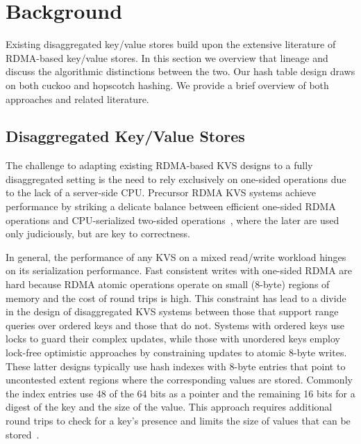 
\section{Background}
\label{sec:background}

Existing disaggregated key/value stores build upon the extensive literature of
RDMA-based key/value stores. In this section we overview that lineage and discuss the algorithmic
distinctions between the two. Our hash table design draws on both cuckoo and hopscotch hashing. We
provide a brief overview of both approaches and related literature.



\subsection{Disaggregated Key/Value Stores}

The challenge to adapting existing RDMA-based KVS designs to a fully
disaggregated setting is the need to rely exclusively on one-sided
operations due to the lack of a server-side CPU.  Precursor RDMA KVS
systems achieve performance by striking a delicate balance between
efficient one-sided RDMA operations and CPU-serialized two-sided
operations~\cite{farm,herd,pilaf,cell,storm}, where the later are used
only judiciously, but are key to correctness.

In general, the performance of any KVS on a mixed read/write workload
hinges on its serialization performance.  Fast consistent writes with
one-sided RDMA are hard because RDMA atomic operations operate on
small (8-byte) regions of memory and the cost of round trips is
high. This constraint has lead to a divide in the design of
disaggregated KVS systems between those that support range queries over
ordered keys and those that do not. Systems with ordered keys use
locks to guard their complex updates, while those
with unordered keys employ lock-free optimistic approaches by
constraining updates to atomic 8-byte writes. These latter designs
typically use hash indexes with 8-byte entries that point to
uncontested extent regions where the corresponding values are stored.
Commonly the index entries use 48 of the 64 bits as a pointer and the
remaining 16 bits for a digest of the key and the size of the value.
This approach requires additional round trips to check for a key's
presence and limits the size of values that can be
stored~\cite{fusee,race}.

